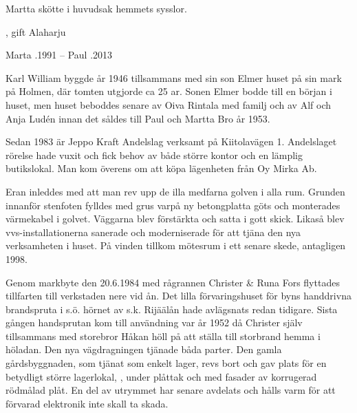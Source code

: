 

Martta skötte i huvudsak hemmets sysslor.
\begin{jhchildren}
  \item {}, gift Alaharju
  \item {}
\end{jhchildren}

Marta .1991  --  Paul .2013


Karl William byggde år 1946 tillsammans med sin son Elmer huset på sin mark på Holmen, där tomten utgjorde ca 25 ar. Sonen Elmer bodde till en början i huset, men huset beboddes senare av Oiva Rintala med familj och av Alf och Anja Ludén innan det såldes till Paul och Martta Bro år 1953.




Sedan 1983 är Jeppo Kraft Andelslag verksamt på Kiitolavägen 1. Andelslaget rörelse hade vuxit och fick behov av både större kontor och en lämplig butikslokal. Man kom överens om att köpa lägenheten från Oy Mirka Ab.

Eran inleddes med att man rev upp de illa medfarna golven i alla rum. Grunden innanför stenfoten fylldes med grus varpå ny betongplatta göts och monterades värmekabel i golvet. Väggarna blev förstärkta och satta i gott skick. Likaså blev vvs-installationerna sanerade och moderniserade för att tjäna den nya verksamheten i huset. På vinden tillkom mötesrum i ett senare skede, antagligen 1998.



Genom markbyte den 20.6.1984 med rågrannen Christer \& Runa Fors flyttades tillfarten till verkstaden nere vid ån. Det lilla förvaringshuset för byns handdrivna brandspruta i s.ö. hörnet av s.k. Rijäälån hade avlägsnats redan tidigare. Sista gången handsprutan kom till användning var år 1952 då Christer själv tillsammans med storebror Håkan höll på att ställa till storbrand hemma i höladan. Den nya vägdragningen tjänade båda parter. Den gamla gårdsbyggnaden, som tjänat som enkelt lager, revs bort och gav plats för en betydligt större lagerlokal, , under plåttak och med fasader av korrugerad rödmålad plåt. En del av utrymmet har senare avdelats och hålls varm för att förvarad elektronik inte skall ta skada.


